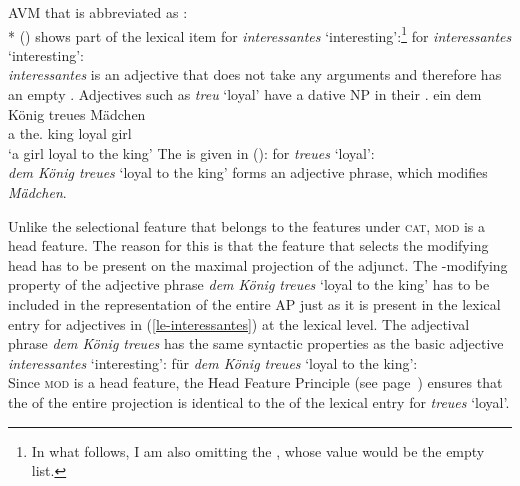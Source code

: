 \ea
AVM that is abbreviated as \nbar:\\*
\z
() shows part of the lexical item for \emph{interessantes} `interesting':\footnote{%
  In what follows, I am also omitting the \sprf, whose value would be the empty list.%
}
\eas{}
\label{le-interessantes}
\catv for \emph{interessantes} `interesting':\\
\zs
\emph{interessantes} is an adjective that does not take any arguments and therefore has an empty
\compsl.
Adjectives such as \emph{treu} `loyal' have a dative NP in their \compsl.
\ea
\gll ein dem König treues Mädchen\\
	a the.\dat{} king loyal girl\\
\glt `a girl loyal to the king'
\z
The \catv is given in ():
\ea
\label{le-treue}
\catv for \emph{treues} `loyal':\\
\z
\emph{dem König treues} `loyal to the king' forms an adjective phrase, which modifies \emph{Mädchen}.

Unlike the selectional feature \comps that belongs to the features under \textsc{cat}, \textsc{mod} is a head feature.
The reason for this is that the feature that selects the modifying head has to be present on the maximal projection of the adjunct. The  \nbar{}-modifying property of the adjective
phrase \emph{dem König treues} `loyal to the king' has to be included in the representation of the entire AP just as it is present in the lexical entry for adjectives in (\ref{le-interessantes})
at the lexical level. The adjectival phrase \emph{dem König treues} has the same syntactic
properties as the basic adjective \emph{interessantes} `interesting':
\ea
\label{avm-dem-koenig-treues}
\catv für \emph{dem König treues} `loyal to the king':\\
\z
Since \textsc{mod} is a head feature, the Head Feature Principle (see page~\pageref{prinzip-hfp}) ensures that the \modv of the entire projection is identical
to the \modv of the lexical entry for \emph{treues} `loyal'.

